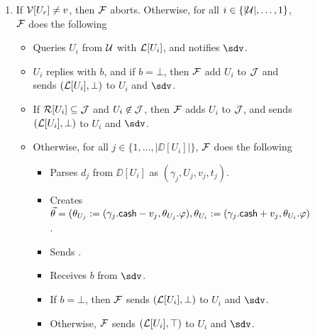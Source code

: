 \begin{figure*}[!t]
{{\begin{enumerate}
	\item If $\mathcal{V}[U_r] \neq v$, then $\mathcal{F}$ aborts. Otherwise, for all $i \in \{|\mathcal{U}|,\ldots,1\}$, 
	$\mathcal{F}$ does the following
	\begin{itemize}[label=-]
		\item Queries $U_i$ from $\mathcal{U}$ with $\mathcal{L}[U_i]$, and notifies $\sdv$.
		\item $U_i$ replies with $b$, and if $b = \bot$, then $\mathcal{F}$ add $U_i$ to $\mathcal{J}$ and sends
		$(\mathcal{L}[U_i],\bot)$ to $U_i$ and $\sdv$. 
		\item If $\mathcal{R}[U_i] \subseteq \mathcal{J}$ and $U_i \not\in \mathcal{J}$, then $\mathcal{F}$ adds $U_i$ to $\mathcal{J}$, 
		and sends $(\mathcal{L}[U_i],\bot)$ to $U_i$ and $\sdv$.
		\item Otherwise, for all $j \in \{1,\ldots,|\DD[U_i]|\}$, $\mathcal{F}$ does the following
		\begin{itemize}[label=$\circ$]
			\item Parses $d_j$ from $\DD[U_i]$ as $(\gamma_j,U_j,v_j,t_j)$.
			\item Creates $\vec{\theta} = (\theta_{U_j} := (\gamma_j.\mathsf{cash} - v_j, \theta_{U_j}.
			\varphi), \theta_{U_i} := (\gamma_j.\mathsf{cash} + v_j, \theta_{U_i}.\varphi)$. 
			\item Sends .
			\item Receives $b$ from $\sdv$.
			\item If $b = \bot$, then $\mathcal{F}$ sends $(\mathcal{L}[U_i], \bot)$ to $U_i$ and $\sdv$.
			\item Otherwise, $\mathcal{F}$ sends $(\mathcal{L}[U_i], \top)$ to $U_i$ and $\sdv$.
		\end{itemize}
	\end{itemize}
	

\end{enumerate}}}
\end{figure*}
